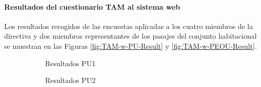 \paragraph{Resultados del cuestionario TAM al sistema web} Los resultados recogidos de las encuestas aplicadas a los cuatro miembros de la directiva y dos miembros representantes de los pasajes del conjunto habitacional se muestran en las Figuras \ref{fig:TAM-w-PU-Result} y \ref{fig:TAM-w-PEOU-Result}.
\begin{figure}[H]
    \centering
    \begin{subfigure}[b]{0.4\textwidth}
        \caption{Resultados PU1}
    \end{subfigure}%
    \hfill
    \begin{subfigure}[b]{0.4\textwidth}
        \caption{Resultados PU2}
    \end{subfigure}%
    \\
    \begin{subfigure}[b]{0.4\textwidth}

\end{subfigure}
\end{figure}
